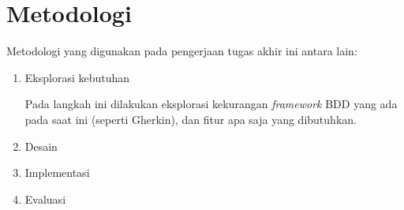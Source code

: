 \section{Metodologi}

Metodologi yang digunakan pada pengerjaan tugas akhir ini antara lain:

\begin{enumerate}
    \item Eksplorasi kebutuhan

    Pada langkah ini dilakukan eksplorasi kekurangan \emph{framework} BDD yang ada pada saat ini
    (seperti Gherkin), dan fitur apa saja yang dibutuhkan.

    \item Desain 
    \item Implementasi 
    \item Evaluasi
\end{enumerate}
